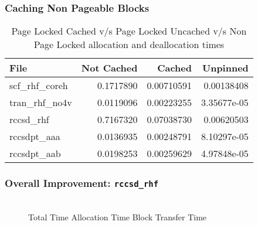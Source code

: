 \documentclass{beamer}
\begin{document}
\begin{frame}[fragile]
  \frametitle{Caching Non Pageable Blocks}
  \begin{table}[h]
    \centering
    \begin{tabular}{l<{\onslide<2->} r<{\onslide<3->} r<{\onslide<4->} r<{\onslide}}
      \hline
      File            & Not Cached & Cached     & Unpinned    \\
      \hline
      scf\_rhf\_coreh & 0.1717890  & 0.00710591 & 0.00138408  \\
      tran\_rhf\_no4v & 0.0119096  & 0.00223255 & 3.35677e-05 \\
      rccsd\_rhf      & 0.7167320  & 0.07038730 & 0.00620503  \\
      rccsdpt\_aaa    & 0.0136935  & 0.00248791 & 8.10297e-05 \\
      rccsdpt\_aab    & 0.0198253  & 0.00259629 & 4.97848e-05 \\
      \hline
    \end{tabular}
    \caption{Page Locked Cached v/s Page Locked Uncached v/s Non Page Locked allocation
      and deallocation times}
  \end{table}
\end{frame}


\begin{frame}[fragile]
  \frametitle{Overall Improvement: \texttt{rccsd\_rhf}}
  \fontsize{7pt}{7.2}\selectfont
  \begin{figure}[h]
    \resizebox{.9\linewidth}{!}{}
    \\
     Total Time
     Allocation Time
      Block Transfer Time
  \end{figure}
\end{frame}
\end{document}
